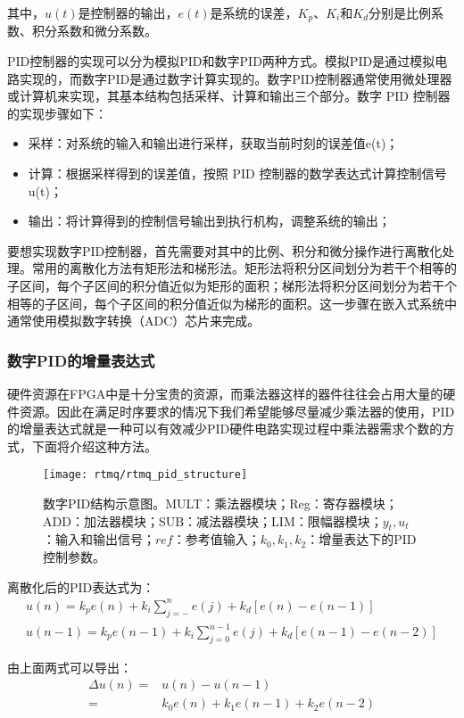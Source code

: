 其中，$u(t)$是控制器的输出，$e(t)$是系统的误差，$K_p$、$K_i$和$K_d$分别是比例系数、积分系数和微分系数。
 
PID控制器的实现可以分为模拟PID和数字PID两种方式。模拟PID是通过模拟电路实现的，而数字PID是通过数字计算实现的。数字PID控制器通常使用微处理器或计算机来实现，其基本结构包括采样、计算和输出三个部分。数字 PID 控制器的实现步骤如下：
\begin{itemize}
    \item 采样：对系统的输入和输出进行采样，获取当前时刻的误差值e(t)；
    \item 计算：根据采样得到的误差值，按照 PID 控制器的数学表达式计算控制信号u(t)；
    \item 输出：将计算得到的控制信号输出到执行机构，调整系统的输出；
\end{itemize}

要想实现数字PID控制器，首先需要对其中的比例、积分和微分操作进行离散化处理。常用的离散化方法有矩形法和梯形法。矩形法将积分区间划分为若干个相等的子区间，每个子区间的积分值近似为矩形的面积；梯形法将积分区间划分为若干个相等的子区间，每个子区间的积分值近似为梯形的面积。这一步骤在嵌入式系统中通常使用模拟数字转换（ADC）芯片来完成。

\subsubsection[数字PID的增量表达式]{数字PID的增量表达式}
硬件资源在FPGA中是十分宝贵的资源，而乘法器这样的器件往往会占用大量的硬件资源。因此在满足时序要求的情况下我们希望能够尽量减少乘法器的使用，PID的增量表达式就是一种可以有效减少PID硬件电路实现过程中乘法器需求个数的方式，下面将介绍这种方法。

\begin{figure}
    \centering
    \caption[数字PID结构示意图]{数字PID结构示意图。MULT：乘法器模块；Reg：寄存器模块；ADD：加法器模块；SUB：减法器模块；LIM：限幅器模块；$y_t, u_t$：输入和输出信号；$ref$：参考值输入；$k_0, k_1, k_2$：增量表达下的PID控制参数。\label{fig:rtmq_pid_structure}}
    \texttt{[image: rtmq/rtmq\_pid\_structure]}
\end{figure}

离散化后的PID表达式为：
\begin{align}
    u(n)=k_p e(n)+k_i\sum_{j=-}^{n}e(j)+k_d[e(n)-e(n-1)]\\
    u(n-1)=k_p e(n-1)+k_i \sum_{j=0}^{n-1}e(j)+k_d [e(n-1)-e(n-2)]
\end{align}

由上面两式可以导出：
\begin{align}
    \Delta u(n)=&u(n)-u(n-1)\\
    =&k_0 e(n)+k_1 e(n-1)+k_2 e(n-2)
\end{align}

